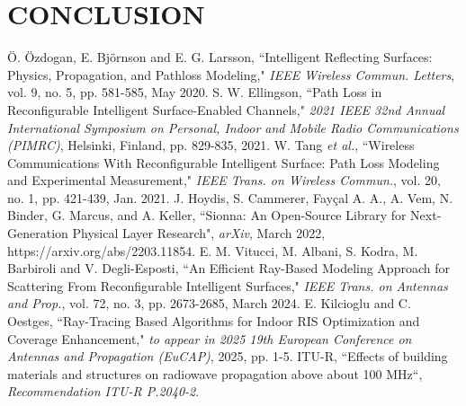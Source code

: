 \documentclass{IEEEoj}
\begin{document}
\section{CONCLUSION} \label{sec:conclusion}

\begin{thebibliography}{00}
	 Ö. Özdogan, E. Björnson and E. G. Larsson, “Intelligent Reflecting Surfaces: Physics, Propagation, and Pathloss Modeling," \textit{IEEE Wireless Commun. Letters}, vol. 9, no. 5, pp. 581-585, May 2020.
	 S. W. Ellingson, “Path Loss in Reconfigurable Intelligent Surface-Enabled Channels," \textit{2021 IEEE 32nd Annual International Symposium on Personal, Indoor and Mobile Radio Communications (PIMRC)}, Helsinki, Finland, pp. 829-835, 2021.
	 W. Tang \textit{et al.}, “Wireless Communications With Reconfigurable Intelligent Surface: Path Loss Modeling and Experimental Measurement," \textit{IEEE Trans. on Wireless Commun.}, vol. 20, no. 1, pp. 421-439, Jan. 2021.
	 J. Hoydis, S. Cammerer, Fayçal {A. A.}, A. Vem, N. Binder, G. Marcus, and A. Keller, “Sionna: An Open-Source Library for Next-Generation Physical Layer Research", \textit{arXiv}, March 2022, https://arxiv.org/abs/2203.11854.
	 E. M. Vitucci, M. Albani, S. Kodra, M. Barbiroli and V. Degli-Esposti, “An Efficient Ray-Based Modeling Approach for Scattering From Reconfigurable Intelligent Surfaces," \textit{IEEE Trans. on Antennas and Prop.}, vol. 72, no. 3, pp. 2673-2685, March 2024.
	 E. Kilcioglu and C. Oestges, “Ray-Tracing Based Algorithms for Indoor RIS Optimization and Coverage Enhancement," \textit{to appear in 2025 19th European Conference on Antennas and Propagation (EuCAP)}, 2025, pp. 1-5.
	 ITU-R, “Effects of building materials and structures on radiowave propagation above about 100 MHz“, \textit{Recommendation ITU-R P.2040-2}. 
\end{thebibliography}
\end{document}
